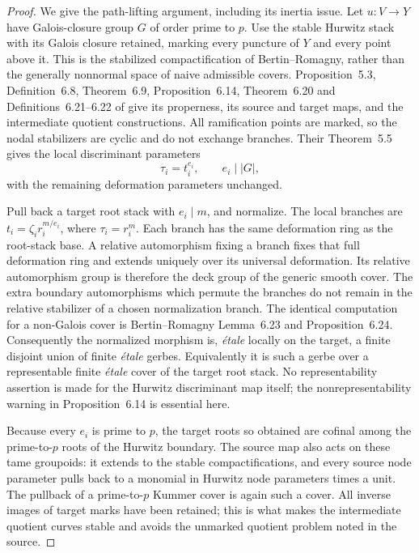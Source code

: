 \begin{proof}
We give the path-lifting argument, including its inertia issue.
Let $u:V\to Y$ have Galois-closure group $G$ of order prime to
$p$. Use the stable Hurwitz stack with its Galois closure retained,
marking every puncture of $Y$ and every point above it. This is
the stabilized compactification of Bertin--Romagny, rather than
the generally nonnormal space of naive admissible covers.
Proposition~5.3, Definition~6.8, Theorem~6.9, Proposition~6.14,
Theorem~6.20 and Definitions~6.21--6.22 of \citet{E_BR2007}
give its properness, its source and target maps, and the
intermediate quotient constructions. All ramification points
are marked, so the nodal stabilizers are cyclic and do not
exchange branches. Their Theorem~5.5 gives the local
discriminant parameters
\[
                      \tau_i=t_i^{e_i},\qquad e_i\mid |G|,
\]
with the remaining deformation parameters unchanged.

Pull back a target root stack with $e_i\mid m$, and normalize.
The local branches are
$t_i=\zeta_i r_i^{m/e_i}$, where $\tau_i=r_i^m$.
Each branch has the same deformation ring as the root-stack
base. A relative automorphism fixing a branch fixes that full
deformation ring and extends uniquely over its universal
deformation. Its relative automorphism group is therefore the
deck group of the generic smooth cover. The extra boundary
automorphisms which permute the branches do not remain in the
relative stabilizer of a chosen normalization branch.
The identical computation for a non-Galois cover is
Bertin--Romagny Lemma~6.23 and Proposition~6.24. Consequently the
normalized morphism is, \emph{\'etale} locally on the target,
a finite disjoint union of finite \emph{\'etale} gerbes.
Equivalently it is such a gerbe over a representable finite
\emph{\'etale} cover of the target root stack. No
representability assertion is made for the Hurwitz discriminant
map itself; the nonrepresentability warning in Proposition~6.14
is essential here.

Because every $e_i$ is prime to $p$, the target roots so obtained
are cofinal among the prime-to-$p$ roots of the Hurwitz boundary.
The source map also acts on these tame groupoids: it extends
to the stable compactifications, and every source node parameter
pulls back to a monomial in Hurwitz node parameters times a unit.
The pullback of a prime-to-$p$ Kummer cover is again such a
cover. All inverse images of target marks have been retained;
this is what makes the intermediate quotient curves stable
and avoids the unmarked quotient problem noted in the source.


\end{proof}
